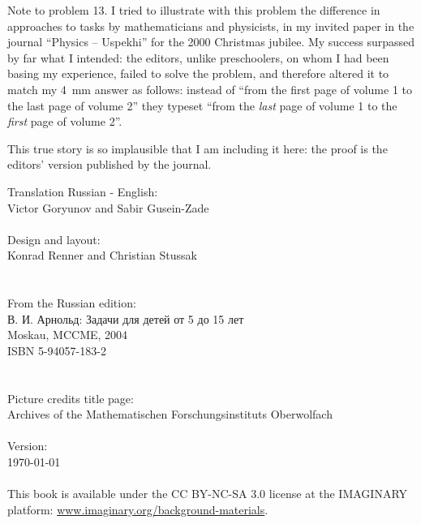\vfill
\begin{note}{Note to problem 13.}
	I tried to illustrate with this problem the difference in approaches to tasks by mathematicians and physicists, in my invited paper in the journal \enquote{Physics -- Uspekhi} for the 2000 Christmas jubilee. My success surpassed by far what I intended: the editors, unlike preschoolers, on whom I had been basing my experience, failed to solve the problem, and therefore altered it to match my \SI{4}{\mm} answer as follows: instead of \enquote{from the first page of volume 1 to the last page of volume 2} they typeset \enquote{from the \emph{last} page of volume 1 to the \emph{first} page of volume 2}.

	This true story is so implausible that I am including it here: the proof is the editors' version published by the journal.  
\end{note}
\clearpage
\null\vfill
\noindent
Translation Russian - English:\\
\null\quad Victor Goryunov and Sabir Gusein-Zade\\
\\
Design and layout:\\
\null\quad Konrad Renner and Christian Stussak\\
\\
\\
From the Russian edition:\\
\null\quad \textrussian{В. И. Арнольд: Задачи для детей от 5 до 15 лет}\\
\null\quad Moskau, MCCME, 2004\\
\null\quad ISBN 5-94057-183-2\\
\\
\\
Picture credits title page:\\ 
\null\quad Archives of the Mathematischen Forschungsinstituts Oberwolfach\\
\\
Version:\\
\null\quad \today\\
\\
This book is available under the CC BY-NC-SA 3.0 license at the IMAG\-I\-NARY platform: \href{http://www.imaginary.org/background-materials}{www.imaginary.org/background-materials}.

